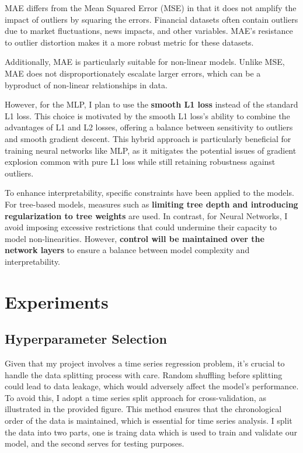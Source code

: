 \documentclass[12pt]{article}
\newtheorem{Proof of Lemma}{Proof of Lemma}
\begin{document}
MAE differs from the Mean Squared Error (MSE) in that it does not amplify the impact of outliers by squaring the errors. Financial datasets often contain outliers due to market fluctuations, news impacts, and other variables. MAE's resistance to outlier distortion makes it a more robust metric for these datasets.

Additionally, MAE is particularly suitable for non-linear models. Unlike MSE, MAE does not disproportionately escalate larger errors, which can be a byproduct of non-linear relationships in data.

However, for the MLP, I plan to use the \textbf{smooth L1 loss} instead of the standard L1 loss. This choice is motivated by the smooth L1 loss's ability to combine the advantages of L1 and L2 losses, offering a balance between sensitivity to outliers and smooth gradient descent. This hybrid approach is particularly beneficial for training neural networks like MLP, as it mitigates the potential issues of gradient explosion common with pure L1 loss while still retaining robustness against outliers.

To enhance interpretability, specific constraints have been applied to the models. For tree-based models, measures such as \textbf{limiting tree depth and introducing regularization to tree weights} are used. In contrast, for Neural Networks, I avoid imposing excessive restrictions that could undermine their capacity to model non-linearities. However, \textbf{control will be maintained over the network layers} to ensure a balance between model complexity and interpretability.


\section{Experiments}
\subsection{Hyperparameter Selection}

Given that my project involves a time series regression problem, it's crucial to handle the data splitting process with care. Random shuffling before splitting could lead to data leakage, which would adversely affect the model's performance. To avoid this, I adopt a time series split approach for cross-validation, as illustrated in the provided figure. This method ensures that the chronological order of the data is maintained, which is essential for time series analysis. I split the data into two parts, one is traing data which is used to train and validate our model, and the second serves for testing purposes.
\end{document}
